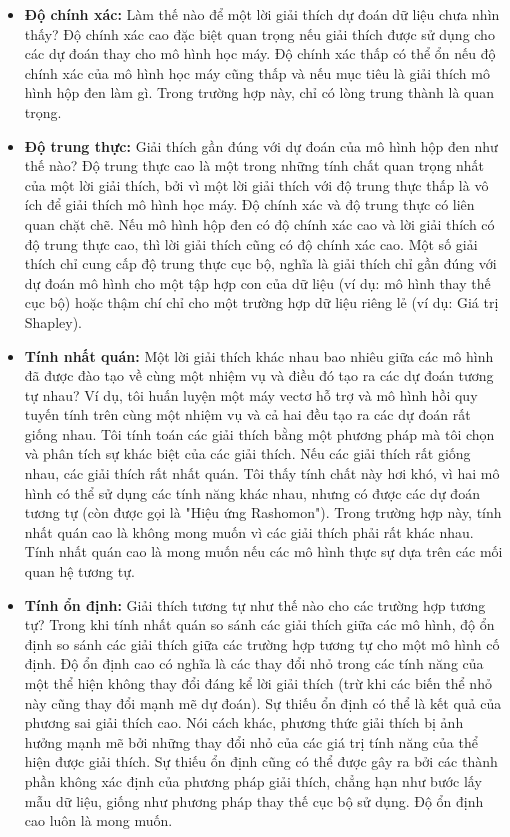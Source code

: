 \begin{itemize}
    \item \textbf{Độ chính xác:} Làm thế nào để một lời giải thích dự đoán dữ liệu chưa nhìn thấy? Độ chính xác cao đặc biệt quan trọng nếu giải thích được sử dụng cho các dự đoán thay cho mô hình học máy. Độ chính xác thấp có thể ổn nếu độ chính xác của mô hình học máy cũng thấp và nếu mục tiêu là giải thích mô hình hộp đen làm gì. Trong trường hợp này, chỉ có lòng trung thành là quan trọng.
    \item \textbf{Độ trung thực:} Giải thích gần đúng với dự đoán của mô hình hộp đen như thế nào? Độ trung thực cao là một trong những tính chất quan trọng nhất của một lời giải thích, bởi vì một lời giải thích với độ trung thực thấp là vô ích để giải thích mô hình học máy. Độ chính xác và độ trung thực có liên quan chặt chẽ. Nếu mô hình hộp đen có độ chính xác cao và lời giải thích có độ trung thực cao, thì lời giải thích cũng có độ chính xác cao. Một số giải thích chỉ cung cấp độ trung thực cục bộ, nghĩa là giải thích chỉ gần đúng với dự đoán mô hình cho một tập hợp con của dữ liệu (ví dụ: mô hình thay thế cục bộ) hoặc thậm chí chỉ cho một trường hợp dữ liệu riêng lẻ (ví dụ: Giá trị Shapley).
    \item \textbf{Tính nhất quán:} Một lời giải thích khác nhau bao nhiêu giữa các mô hình đã được đào tạo về cùng một nhiệm vụ và điều đó tạo ra các dự đoán tương tự nhau? Ví dụ, tôi huấn luyện một máy vectơ hỗ trợ và mô hình hồi quy tuyến tính trên cùng một nhiệm vụ và cả hai đều tạo ra các dự đoán rất giống nhau. Tôi tính toán các giải thích bằng một phương pháp mà tôi chọn và phân tích sự khác biệt của các giải thích. Nếu các giải thích rất giống nhau, các giải thích rất nhất quán. Tôi thấy tính chất này hơi khó, vì hai mô hình có thể sử dụng các tính năng khác nhau, nhưng có được các dự đoán tương tự (còn được gọi là "Hiệu ứng Rashomon"). Trong trường hợp này, tính nhất quán cao là không mong muốn vì các giải thích phải rất khác nhau. Tính nhất quán cao là mong muốn nếu các mô hình thực sự dựa trên các mối quan hệ tương tự.
    \item \textbf{Tính ổn định:} Giải thích tương tự như thế nào cho các trường hợp tương tự? Trong khi tính nhất quán so sánh các giải thích giữa các mô hình, độ ổn định so sánh các giải thích giữa các trường hợp tương tự cho một mô hình cố định. Độ ổn định cao có nghĩa là các thay đổi nhỏ trong các tính năng của một thể hiện không thay đổi đáng kể lời giải thích (trừ khi các biến thể nhỏ này cũng thay đổi mạnh mẽ dự đoán). Sự thiếu ổn định có thể là kết quả của phương sai giải thích cao. Nói cách khác, phương thức giải thích bị ảnh hưởng mạnh mẽ bởi những thay đổi nhỏ của các giá trị tính năng của thể hiện được giải thích. Sự thiếu ổn định cũng có thể được gây ra bởi các thành phần không xác định của phương pháp giải thích, chẳng hạn như bước lấy mẫu dữ liệu, giống như phương pháp thay thế cục bộ sử dụng. Độ ổn định cao luôn là mong muốn.

\end{itemize}
